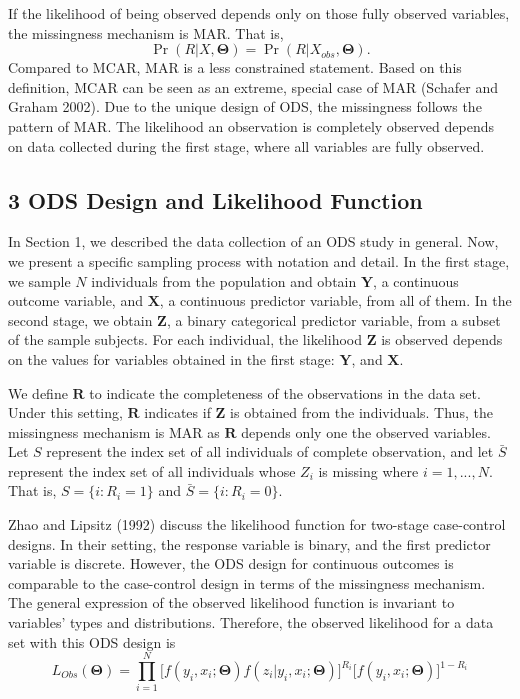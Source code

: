\documentclass[
  12pt,
]{article}
\begin{document}
If the likelihood of being observed depends only on those fully observed
variables, the missingness mechanism is MAR. That is, \[
\Pr(R|X, \boldsymbol\Theta) = \Pr(R|X_{obs}, \boldsymbol\Theta).
\] Compared to MCAR, MAR is a less constrained statement. Based on this
definition, MCAR can be seen as an extreme, special case of MAR (Schafer
and Graham 2002). Due to the unique design of ODS, the missingness
follows the pattern of MAR. The likelihood an observation is completely
observed depends on data collected during the first stage, where all
variables are fully observed.

\hypertarget{ods-design-and-likelihood-function}{%
\subsection{3 ODS Design and Likelihood
Function}\label{ods-design-and-likelihood-function}}

In Section 1, we described the data collection of an ODS study in
general. Now, we present a specific sampling process with notation and
detail. In the first stage, we sample \(N\) individuals from the
population and obtain \(\boldsymbol{Y}\), a continuous outcome variable,
and \(\boldsymbol{X}\), a continuous predictor variable, from all of
them. In the second stage, we obtain \(\boldsymbol{Z}\), a binary
categorical predictor variable, from a subset of the sample subjects.
For each individual, the likelihood \(\boldsymbol{Z}\) is observed
depends on the values for variables obtained in the first stage:
\(\boldsymbol{Y}\), and \(\boldsymbol{X}\).

We define \(\boldsymbol{R}\) to indicate the completeness of the
observations in the data set. Under this setting, \(\boldsymbol{R}\)
indicates if \(\boldsymbol{Z}\) is obtained from the individuals. Thus,
the missingness mechanism is MAR as \(\boldsymbol{R}\) depends only one
the observed variables. Let \(S\) represent the index set of all
individuals of complete observation, and let \(\bar{S}\) represent the
index set of all individuals whose \(Z_i\) is missing where
\(i = 1,...,N\). That is, \(S = \{i: R_i = 1\}\) and
\(\bar{S} = \{i: R_i = 0\}\).

Zhao and Lipsitz (1992) discuss the likelihood function for two-stage
case-control designs. In their setting, the response variable is binary,
and the first predictor variable is discrete. However, the ODS design
for continuous outcomes is comparable to the case-control design in
terms of the missingness mechanism. The general expression of the
observed likelihood function is invariant to variables' types and
distributions. Therefore, the observed likelihood for a data set with
this ODS design is \[
L_{Obs}(\boldsymbol\Theta) = \prod_{i=1}^{N} \big[ f(y_i, x_i; \boldsymbol\Theta)f(z_i|y_i, x_i; \boldsymbol\Theta) \big]^{R_i} \big[ f(y_i, x_i; \boldsymbol\Theta) \big]^{1-R_i}
\]
\end{document}
